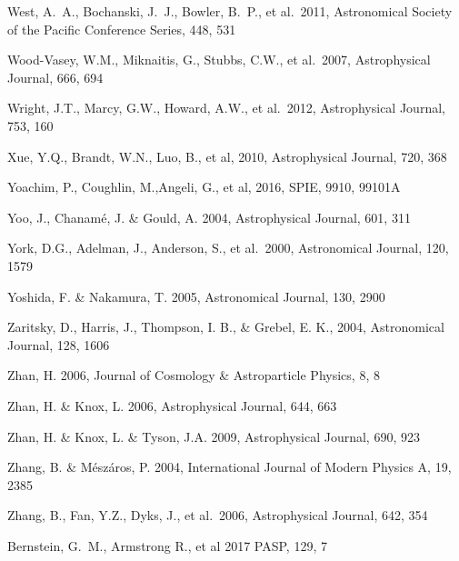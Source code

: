 \documentclass[twocolumn]{aastex61}
\begin{document}
\begin{thebibliography}{}
 West, A.~A., Bochanski, J.~J., Bowler, B.~P., et al.~2011, Astronomical Society of the Pacific Conference Series, 448, 531

 Wood-Vasey, W.M., Miknaitis, G., Stubbs, C.W., et al.~2007, Astrophysical Journal, 666, 694

 Wright, J.T., Marcy, G.W., Howard, A.W., et al.~2012, Astrophysical Journal, 753, 160

 Xue, Y.Q., Brandt, W.N., Luo, B., et al, 2010,  Astrophysical Journal, 720, 368

 Yoachim, P., Coughlin, M.,Angeli, G., et al, 2016, SPIE, 9910, 99101A

 Yoo, J., Chanam\'{e}, J. \& Gould, A. 2004, Astrophysical Journal, 601, 311

 York, D.G., Adelman, J., Anderson, S., et al.~2000, Astronomical Journal, 120, 1579

 Yoshida, F. \& Nakamura, T. 2005, Astronomical Journal, 130, 2900

 Zaritsky, D., Harris, J., Thompson, I. B., \& Grebel, E. K., 2004, Astronomical Journal, 128, 1606

 Zhan, H. 2006, Journal of Cosmology \& Astroparticle Physics, 8, 8

 Zhan, H. \& Knox, L. 2006,  Astrophysical Journal, 644, 663

 Zhan, H. \& Knox, L. \& Tyson, J.A. 2009,  Astrophysical Journal, 690, 923

 Zhang, B. \& M\'{e}sz\'{a}ros, P. 2004, International Journal of Modern Physics A, 19, 2385

 Zhang, B., Fan, Y.Z., Dyks, J., et al.~2006,  Astrophysical Journal, 642, 354

 Bernstein, G.~M., Armstrong R., et al 2017 PASP, 129, 7

\end{thebibliography}
\end{document}
